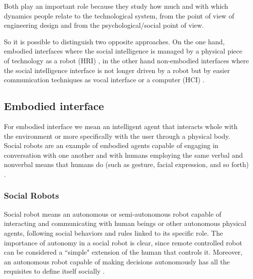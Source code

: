 \documentclass{thesisreport}
\begin{document}
 Both play an important role because they study how much and with which dynamics people relate to the technological system, from the point of view of engineering design and from the psychological/social point of view. 
 
 So it is possible to distinguish two opposite approaches. On the one hand, embodied interfaces where the social intelligence is managed by a physical piece of technology as a robot (HRI) \cite{lakkaraju2016interpretable, antle2009human, feil2005multi}, in the other hand non-embodied interfaces where the social intelligence interface is not longer driven by a robot but by easier communication techniques as vocal interface or a computer (HCI) \cite{antle2009human, feil2005multi}.  


\subsection{Embodied interface}
For embodied interface we mean an intelligent agent that interacts whole with the environment or more specifically with the user through a physical body. Social robots are an example of embodied agents capable of engaging in conversation with one another and with humans employing the same verbal and nonverbal means that humans do (such as gesture, facial expression, and so forth) \cite{serenko2007end}.
\subsubsection{Social Robots}
Social robot means an autonomous or semi-autonomous robot capable of interacting and communicating with human beings or other autonomous physical agents, following social behaviors and rules linked to its specific role. The importance of autonomy in a social robot is clear, since remote controlled robot can be considered a ``simple" extension of the human that controls it. Moreover, an autonomous robot capable of making decisions autonomously has all the requisites to define itself socially \cite{broekens2009assistive}.
 
\end{document}
